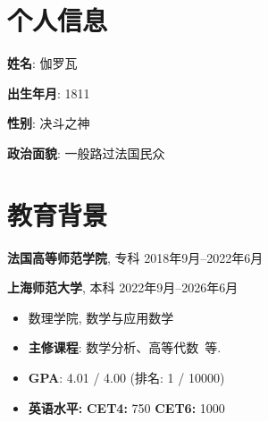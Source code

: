 \documentclass[11pt]{article}
\newlength{\iconwidth}
\begin{document}
    \begin{minipage}[t]{0.78\textwidth}
        \begin{minipage}[t]{\textwidth}
        \section[个人信息]{\makebox[\iconwidth][c]
        {\color{primary_color}{\faAddressCard}}\quad 个人信息}
        \begin{minipage}[t]{0.5\textwidth}
            \textbf{姓\qquad 名}: 伽罗瓦
            
            \vspace{0.5em}
            \textbf{出生年月}: 1811
        \end{minipage}
        \begin{minipage}[t]{0.35\textwidth}
            \textbf{性\qquad 别}: 决斗之神
            
            \vspace{0.5em}
            \textbf{政治面貌}: 一般路过法国民众
        \end{minipage}
        \vspace{1.2em}
        \end{minipage}

        \begin{minipage}[t]{\textwidth}
        \section[教育背景]{\makebox[\iconwidth][c]{\color{primary_color}{\faGraduationCap}}\quad 教育背景}
        
        {\large \textbf{法国高等师范学院}}, 专科 \hfill 2018年9月--2022年6月
        
        \vspace{0.5em}
        {\large \textbf{上海师范大学}}, 本科 \hfill 2022年9月--2026年6月
        \begin{itemize}
            \item 数理学院, 数学与应用数学 
            \item \textbf{主修课程}: 数学分析、高等代数\ 等. 
            \item \textbf{GPA}: 4.01 / 4.00 (排名: 1 / 10000) 
            \item \textbf{英语水平:} \textbf{CET4:} 750 \qquad \textbf{CET6:} 1000 %
        \end{itemize}        
        \vspace{1.2em}
        \end{minipage}
    \end{minipage}
\end{document}
